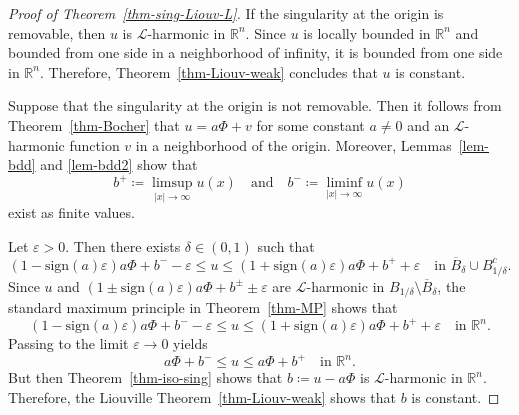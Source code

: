 \documentclass[11pt]{amsart}
\theoremstyle{plain}
\theoremstyle{definition}
\numberwithin{equation}{section}
\begin{document}
\begin{proof}[Proof of Theorem~\ref{thm-sing-Liouv-L}]
If the singularity at the origin is removable, then $u$ is $\mathcal{L}$-harmonic in $\mathbb{R}^n$. Since $u$ is locally bounded in $\mathbb{R}^n$ and bounded from one side in a neighborhood of infinity, it is bounded from one side in $\mathbb{R}^n$. Therefore, Theorem~\ref{thm-Liouv-weak} concludes that $u$ is constant.

Suppose that the singularity at the origin is not removable. Then it follows from Theorem~\ref{thm-Bocher} that $u=a\Phi+v$ for some constant $a \neq 0$ and an $\mathcal{L}$-harmonic function $v$ in a neighborhood of the origin. Moreover, Lemmas~\ref{lem-bdd} and \ref{lem-bdd2} show that
\begin{equation*}
    b^+\coloneqq \limsup_{|x| \to \infty}u(x) \quad \text{and}\quad b^- \coloneqq \liminf_{|x| \to \infty}u(x)
\end{equation*}
exist as finite values.

Let $\varepsilon>0$. Then there exists $\delta \in (0,1)$ such that
\begin{equation*}
(1-\mathrm{sign}(a)\varepsilon)a \Phi + b^- - \varepsilon \leq u \leq (1+\mathrm{sign}(a)\varepsilon)a \Phi + b^+ + \varepsilon \quad\text{in }\overline{B}_\delta \cup B_{1/\delta}^c.
\end{equation*}
Since $u$ and $(1\pm\mathrm{sign}(a)\varepsilon)a\Phi+b^\pm \pm \varepsilon$ are $\mathcal{L}$-harmonic in $B_{1/\delta} \setminus \overline{B}_\delta$, the standard maximum principle in Theorem~\ref{thm-MP} shows that
\begin{equation*}
(1-\mathrm{sign}(a)\varepsilon)a \Phi + b^- - \varepsilon \leq u \leq (1+\mathrm{sign}(a)\varepsilon)a \Phi + b^+ + \varepsilon \quad\text{in }\mathbb{R}^n.
\end{equation*}
Passing to the limit $\varepsilon \to 0$ yields
\begin{equation*}
    a \Phi + b^- \leq u \leq a \Phi + b^+ \quad\text{in }\mathbb{R}^n.
\end{equation*}
But then Theorem~\ref{thm-iso-sing} shows that $b\coloneqq u-a\Phi$ is $\mathcal{L}$-harmonic in $\mathbb{R}^n$. Therefore, the Liouville Theorem~\ref{thm-Liouv-weak} shows that $b$ is constant.
\end{proof}
\end{document}
